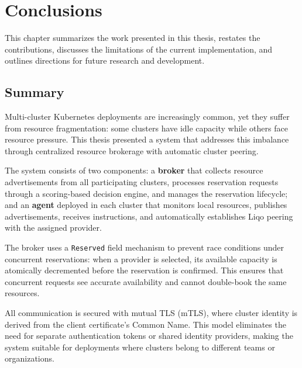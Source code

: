 
\chapter{Conclusions}
\label{ch:conclusions}

This chapter summarizes the work presented in this thesis, restates the contributions, discusses the limitations of the current implementation, and outlines directions for future research and development.


\section{Summary}
\label{sec:summary}

Multi-cluster Kubernetes deployments are increasingly common, yet they suffer from resource fragmentation: some clusters have idle capacity while others face resource pressure. This thesis presented a system that addresses this imbalance through centralized resource brokerage with automatic cluster peering.

The system consists of two components: a \textbf{broker} that collects resource advertisements from all participating clusters, processes reservation requests through a scoring-based decision engine, and manages the reservation lifecycle; and an \textbf{agent} deployed in each cluster that monitors local resources, publishes advertisements, receives instructions, and automatically establishes Liqo peering with the assigned provider.

The broker uses a \texttt{Reserved} field mechanism to prevent race conditions under concurrent reservations: when a provider is selected, its available capacity is atomically decremented before the reservation is confirmed. This ensures that concurrent requests see accurate availability and cannot double-book the same resources.

All communication is secured with mutual TLS (mTLS), where cluster identity is derived from the client certificate's Common Name. This model eliminates the need for separate authentication tokens or shared identity providers, making the system suitable for deployments where clusters belong to different teams or organizations.

